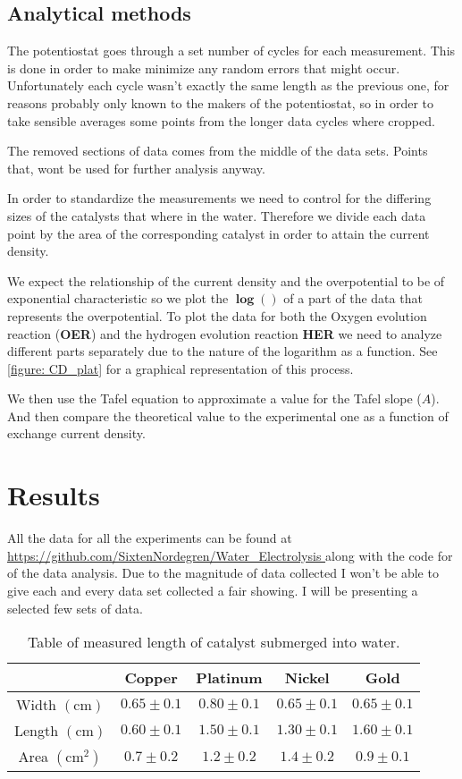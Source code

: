 \documentclass[twocolumn]{revtex4-2}
\begin{document}
\subsection{Analytical methods}
The potentiostat goes through a set number of cycles for each measurement.
This is done in order to make minimize any random errors that might occur. Unfortunately
each cycle wasn't exactly the same length as the previous one, for reasons probably only
known to the makers of the potentiostat, so in order to take sensible averages
some points from the longer data cycles where cropped.
\par
The removed sections of data comes from the middle of the data sets. Points that, wont be
used for further analysis anyway.
\par
In order to standardize the measurements we need to control for the differing sizes of the catalysts
that where in the water. Therefore we divide each data point by the area of the corresponding
catalyst in order to attain the current density.
\par
We expect the relationship of the current density and the overpotential to be of exponential
characteristic so we plot the $\bm{\log{()}} $ of a part of the data that represents the overpotential.
To plot the data for both the Oxygen evolution reaction (\textbf{OER}) and the hydrogen evolution
reaction \textbf{HER} we need to analyze different parts separately due to the nature of the logarithm
as a function. See \ref{figure: CD_plat} for a graphical representation of this process.

\par
We then use the Tafel equation to approximate a value for the Tafel slope ($A$). And then compare
the theoretical value to the experimental one as a function of exchange current density.

\section{Results}
All the data for all the experiments can be found at \url{https://github.com/SixtenNordegren/Water_Electrolysis
} along with the code 
for of the data analysis. Due to the magnitude of data collected I won't be able to
give each and every data set collected a fair showing. I will be presenting a selected 
few sets of data.


\begin{table}[h]
\begin{tabular}{|c|c|c|c|c|}
	\hline
	& Copper & Platinum & Nickel & Gold \\
	\hline
	Width $(\text{cm})$&$0.65\pm 0.1$ &$0.80 \pm 0.1$&$0.65 \pm 0.1$&$0.65 \pm 0.1$\\
	\hline
	Length $(\text{cm})$ &$0.60 \pm 0.1$&$1.50 \pm 0.1$&$1.30 \pm 0.1$&$1.60 \pm 0.1$\\
	\hline
	Area $(\text{cm}^2)$ &$0.7 \pm 0.2$&$1.2 \pm 0.2$&$1.4 \pm 0.2$&$0.9 \pm 0.1$\\
	\hline
\end{tabular}
	\caption{Table of measured length of catalyst submerged into water.\label{table: area}}
\end{table}
\end{document}
